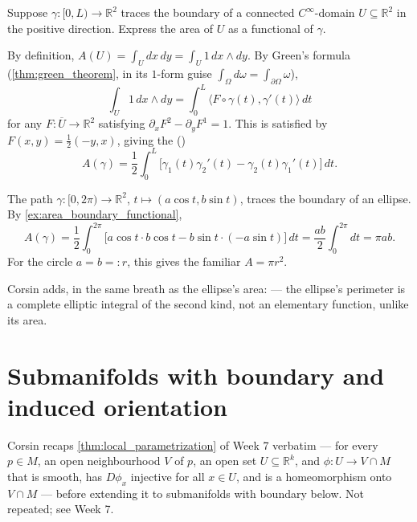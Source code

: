 \begin{exercise}
\label{ex:area_boundary_functional}
Suppose $\gamma : [0,L) \to \mathbb{R}^2$ traces the boundary of a connected $C^\infty$-domain
$U \subseteq \mathbb{R}^2$ in the positive direction. Express the area of $U$ as a functional
of $\gamma$.
\end{exercise}

\begin{exercisesolution}
By definition, $A(U) = \int_U dx\,dy = \int_U 1\,dx\wedge dy$. By Green's formula
(\cref{thm:green_theorem}, in its $1$-form guise $\int_\Omega d\omega =
\int_{\partial\Omega}\omega$),
\[\int_U 1\,dx\wedge dy = \int_0^L \langle F\circ\gamma(t),\gamma'(t)\rangle\,dt\]
for any $F : \overline U \to \mathbb{R}^2$ satisfying $\partial_xF^2 - \partial_yF^1 = 1$. This
is satisfied by $F(x,y) = \tfrac12(-y,x)$, giving the 
()
\[A(\gamma) = \frac12\int_0^L \big[\gamma_1(t)\gamma_2'(t) - \gamma_2(t)\gamma_1'(t)\big]\,dt.\]
\end{exercisesolution}

\begin{example}[Ellipse]
\label{ex:area_ellipse}
The path $\gamma : [0,2\pi) \to \mathbb{R}^2$, $t \mapsto (a\cos t,b\sin t)$, traces the
boundary of an ellipse. By \cref{ex:area_boundary_functional},
\[
A(\gamma) = \frac12\int_0^{2\pi} \big[a\cos t\cdot b\cos t - b\sin t\cdot(-a\sin t)\big]\,dt
  = \frac{ab}{2}\int_0^{2\pi} dt = \pi ab.
\]
For the circle $a=b=:r$, this gives the familiar $A = \pi r^2$.
\end{example}

\begin{ainote}
Corsin adds, in the same breath as the ellipse's area:  --- the ellipse's perimeter is a
complete elliptic integral of the second kind, not an elementary function, unlike its area.
\end{ainote}

\section{Submanifolds with boundary and induced orientation}
\label{sec:submanifolds_with_boundary}

\begin{ainote}
Corsin recaps \cref{thm:local_parametrization} of Week 7 verbatim --- for every $p \in M$, an
open neighbourhood $V$ of $p$, an open set $U \subseteq \mathbb{R}^k$, and $\phi : U \to
V\cap M$ that is smooth, has $D\phi_x$ injective for all $x \in U$, and is a homeomorphism onto
$V\cap M$ --- before extending it to submanifolds with boundary below. Not repeated; see
Week 7.
\end{ainote}

